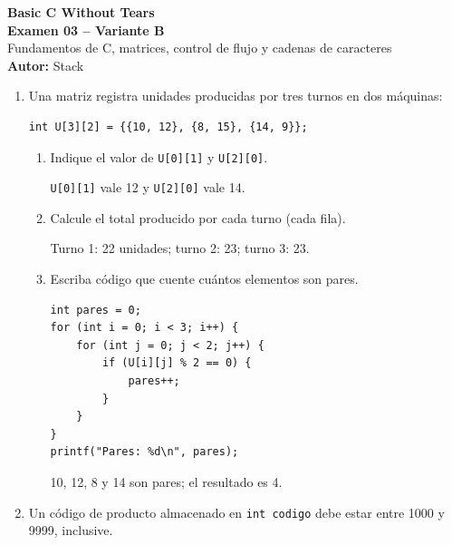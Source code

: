
\newcommand{\NombreDocumento}{Examen 03 -- Variante B}

\begin{center}
    {\LARGE \textbf{Basic C Without Tears}} \\[0.2cm]
    {\Large \textbf{Examen 03 -- Variante B}} \\[0.12cm]
    \small Fundamentos de C, matrices, control de flujo y cadenas de caracteres \\[0.08cm]
    \textbf{Autor:} Stack
\end{center}
\vspace{0.2cm}
\begin{enumerate}[label=\textbf{\arabic*.}]
\item Una matriz registra unidades producidas por tres turnos en dos máquinas:
\begin{lstlisting}[style=customc, numbers=none]
int U[3][2] = {{10, 12}, {8, 15}, {14, 9}};
\end{lstlisting}
\begin{enumerate}[label=(\alph*)]
\item Indique el valor de \texttt{U[0][1]} y \texttt{U[2][0]}.
\ifpauta\begin{solucionbox}\texttt{U[0][1]} vale 12 y \texttt{U[2][0]} vale 14.\end{solucionbox}\else\vspace{1.5cm}\fi
\item Calcule el total producido por cada turno (cada fila).
\ifpauta\begin{solucionbox}Turno 1: 22 unidades; turno 2: 23; turno 3: 23.\end{solucionbox}\else\vspace{2cm}\fi
\item Escriba código que cuente cuántos elementos son pares.
\ifpauta\begin{solucionbox}\begin{lstlisting}[style=customc]
int pares = 0;
for (int i = 0; i < 3; i++) {
    for (int j = 0; j < 2; j++) {
        if (U[i][j] % 2 == 0) {
            pares++;
        }
    }
}
printf("Pares: %d\n", pares);
\end{lstlisting}10, 12, 8 y 14 son pares; el resultado es 4.\end{solucionbox}\else\vspace{3cm}\fi
\end{enumerate}
\newpage
\item Un código de producto almacenado en \texttt{int codigo} debe estar entre 1000 y 9999, inclusive.

\end{enumerate}
